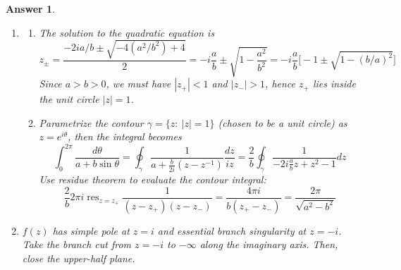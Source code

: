 \documentclass[a4paper]{article}
\DeclareMathOperator{\res}{res}
\newtheorem{ans}{Answer}[section]
\theoremstyle{new}
\begin{document}
\begin{ans}\leavevmode
\begin{enumerate}[label=(\roman*)]
\item
\begin{enumerate}[label=(\alph*)]
\item  The solution to the quadratic equation is
$$z_{\pm}=\frac{-2ia/b\pm\sqrt{-4(a^2/b^2)+4}}{2}=-i\frac{a}{b}\pm\sqrt{1-\frac{a^2}{b^2}}=-i\frac{a}{b}\bigg[-1\pm\sqrt{1-(b/a)^2}\bigg]$$
Since $a>b>0$, we must have $|z_+|<1$ and $|z_-|>1$, hence $z_+$ lies inside the unit circle $|z|=1$.
\item Parametrize the contour $\gamma=\{z:~|z|=1\}$ (chosen to be a unit circle) as $z=e^{i\theta}$, then the integral becomes
$$\int_0^{2\pi}\frac{d\theta}{a+b\sin\theta}=\oint_{\gamma}\frac{1}{a+\frac{b}{2i}(z-z^{-1})}\frac{dz}{iz}=\frac{2}{b}\oint_\gamma\frac{1}{-2i\frac{a}{b}z+z^2-1}dz$$
Use residue theorem to evaluate the contour integral:
$$\frac{2}{b}2\pi i\res_{z=z_+}\frac{1}{(z-z_+)(z-z_-)}=\frac{4\pi i}{b(z_+-z_-)}=\frac{2\pi}{\sqrt{a^2-b^2}}$$
\end{enumerate}
\item $f(z)$ has simple pole at $z=i$ and essential branch singularity at $z=-i$. Take the branch cut from $z=-i$ to $-\infty$ along the imaginary axis. Then, close the upper-half plane. 
\begin{center}
\end{center}
\end{enumerate}
\end{ans}
\end{document}

